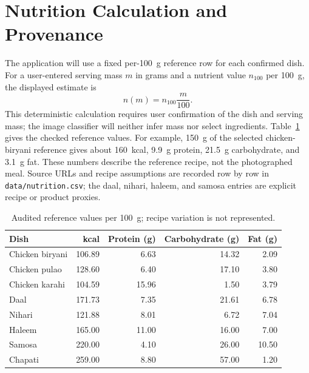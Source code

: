 \documentclass[11pt,a4paper]{article}
\begin{document}
\section{Nutrition Calculation and Provenance}
The application will use a fixed per-100~g reference row for each confirmed dish. For a user-entered serving mass $m$ in grams and a nutrient value $n_{100}$ per 100~g, the displayed estimate is
\begin{equation}
n(m)=n_{100}\frac{m}{100}.
\end{equation}
This deterministic calculation requires user confirmation of the dish and serving mass; the image classifier will neither infer mass nor select ingredients. Table~\ref{tab:nutrition} gives the checked reference values. For example, 150~g of the selected chicken-biryani reference gives about 160~kcal, 9.9~g protein, 21.5~g carbohydrate, and 3.1~g fat. These numbers describe the reference recipe, not the photographed meal. Source URLs and recipe assumptions are recorded row by row in \texttt{data/nutrition.csv}; the daal, nihari, haleem, and samosa entries are explicit recipe or product proxies.

\begin{table}[ht]
\centering
\small
\begin{tabular}{lrrrr}
\toprule
Dish & kcal & Protein (g) & Carbohydrate (g) & Fat (g) \\
\midrule
Chicken biryani & 106.89 & 6.63 & 14.32 & 2.09 \\
Chicken pulao & 128.60 & 6.40 & 17.10 & 3.80 \\
Chicken karahi & 104.59 & 15.96 & 1.50 & 3.79 \\
Daal & 171.73 & 7.35 & 21.61 & 6.78 \\
Nihari & 121.88 & 8.01 & 6.72 & 7.04 \\
Haleem & 165.00 & 11.00 & 16.00 & 7.00 \\
Samosa & 220.00 & 4.10 & 26.00 & 10.50 \\
Chapati & 259.00 & 8.80 & 57.00 & 1.20 \\
\bottomrule
\end{tabular}
\caption{Audited reference values per 100~g; recipe variation is not represented.}
\label{tab:nutrition}
\end{table}
\end{document}

